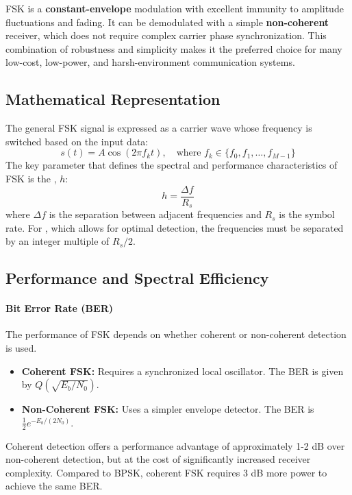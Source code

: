 \begin{keyconcept}
    FSK is a \textbf{constant-envelope} modulation with excellent immunity to amplitude fluctuations and fading. It can be demodulated with a simple \textbf{non-coherent} receiver, which does not require complex carrier phase synchronization. This combination of robustness and simplicity makes it the preferred choice for many low-cost, low-power, and harsh-environment communication systems.
\end{keyconcept}


\subsection{Mathematical Representation}

The general FSK signal is expressed as a carrier wave whose frequency is switched based on the input data:
\begin{equation}
    s(t) = A \cos\left(2\pi f_k t\right), \quad \text{where } f_k \in \{f_0, f_1, \dots, f_{M-1}\}
\end{equation}
The key parameter that defines the spectral and performance characteristics of FSK is the , $h$:
\begin{equation}
    h = \frac{\Delta f}{R_s}
\end{equation}
where $\Delta f$ is the separation between adjacent frequencies and $R_s$ is the symbol rate. For , which allows for optimal detection, the frequencies must be separated by an integer multiple of $R_s/2$.


\subsection{Performance and Spectral Efficiency}

\paragraph{Bit Error Rate (BER)}
The performance of FSK depends on whether coherent or non-coherent detection is used.
\begin{itemize}
    \item \textbf{Coherent FSK:} Requires a synchronized local oscillator. The BER is given by $Q\left(\sqrt{E_b/N_0}\right)$.
    \item \textbf{Non-Coherent FSK:} Uses a simpler envelope detector. The BER is $\frac{1}{2}e^{-E_b/(2N_0)}$.
\end{itemize}
Coherent detection offers a performance advantage of approximately 1-2 dB over non-coherent detection, but at the cost of significantly increased receiver complexity. Compared to BPSK, coherent FSK requires 3 dB more power to achieve the same BER.

